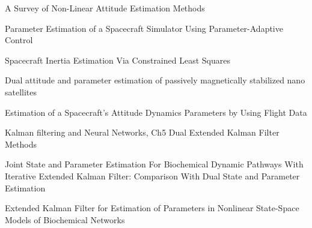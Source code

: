 \documentclass[letterpaper, 10pt, conference]{ieeeconf}      %
\begin{document}
\begin{thebibliography}{99}

 A Survey of Non-Linear Attitude Estimation Methods

 Parameter Estimation of a Spacecraft Simulator Using Parameter-Adaptive Control

 Spacecraft Inertia Estimation Via Constrained Least Squares

 Dual attitude and parameter estimation of passively magnetically stabilized nano satellites


 Estimation of a Spacecraft's Attitude Dynamics Parameters by Using Flight Data

 Kalman filtering and Neural Networks, Ch5 Dual Extended Kalman Filter Methods

 Joint State and Parameter Estimation For Biochemical Dynamic Pathways With Iterative Extended Kalman Filter: Comparison With Dual State and
Parameter Estimation

 Extended Kalman Filter for Estimation of Parameters in Nonlinear State-Space Models of Biochemical Networks
\end{thebibliography}
\end{document}
